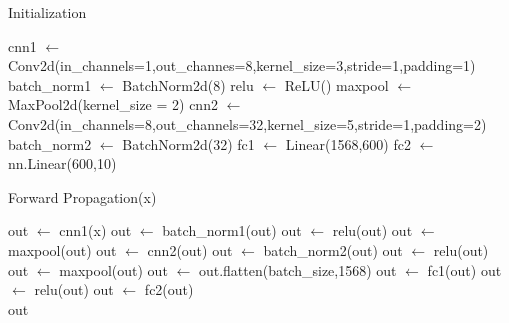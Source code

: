 \documentclass[11pt]{article}
\begin{document}
\begin{algorithm}
\caption{Initialization}
\begin{algorithmic}[1]

    \State cnn1 $\leftarrow$ Conv2d(in\_channels=1,out\_channes=8,kernel\_size=3,stride=1,padding=1)
    \State batch\_norm1 $\leftarrow$ BatchNorm2d(8)
    \State relu $\leftarrow$ ReLU()
    \State maxpool $\leftarrow$ MaxPool2d(kernel\_size = 2)
    \State cnn2 $\leftarrow$ Conv2d(in\_channels=8,out\_channels=32,kernel\_size=5,stride=1,padding=2)
    \State batch\_norm2 $\leftarrow$ BatchNorm2d(32)
	\State fc1 $\leftarrow$ Linear(1568,600)	
	\State fc2 $\leftarrow$ nn.Linear(600,10)
\end{algorithmic}
\end{algorithm}

\begin{algorithm}
\caption{Forward Propagation(x)}
\begin{algorithmic}[1]

    \State out $\leftarrow$ cnn1(x)
    \State out $\leftarrow$ batch\_norm1(out)
    \State out $\leftarrow$ relu(out)
    \State out $\leftarrow$ maxpool(out)
    \State out $\leftarrow$ cnn2(out)
    \State out $\leftarrow$ batch\_norm2(out)
	\State out $\leftarrow$ relu(out)	
	\State out $\leftarrow$ maxpool(out)
	\State out $\leftarrow$ out.flatten(batch\_size,1568)
	\State out $\leftarrow$ fc1(out)
	\State out $\leftarrow$ relu(out)
	\State out $\leftarrow$ fc2(out)\\
	\Return out
\end{algorithmic}
\end{algorithm}
\end{document}
